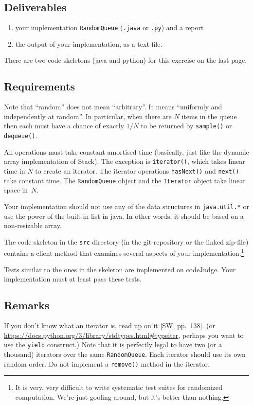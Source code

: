 \documentclass{tufte-handout}
\begin{document}
\subsection{Deliverables}

\begin{enumerate}
\item your implementation {\tt RandomQueue} ({\tt.java} or {\tt.py}) and a report
\item the output of your implementation, as a text file.
\end{enumerate}
There are two code skeletons (java and python) for this exercise on the last page.

\subsection{Requirements}
Note that ``random'' does not mean ``arbitrary''.
It means ``uniformly and independently at random''.
In particular, when there are $N$ items in the queue then each must
have a chance of exactly $1/N$ to be returned by {\tt sample()} or
{\tt dequeue()}.

All operations must take constant amortised time (basically, just like
the dynamic array implementation of Stack).
The exception is {\tt iterator()}, which takes linear time in $N$ to create an iterator.
The iterator operations {\tt hasNext()} and {\tt next()} take constant
time.
The {\tt RandomQueue} object and the {\tt Iterator} object take linear
space in~$N$.

Your implementation should not use any of the data structures in \texttt{java.util.*} or use the power of the built-in list in java. In other words, it should be based on a non-resizable array. 

The code skeleton in the {\tt src} directory (in the git-repository or the linked zip-file) contains a client method
that examines several aspects of your implementation.\footnote{It is very, very difficult to write systematic test suites for
randomized computation. We're just goofing around, but it's better
than nothing.}

Tests similar to the ones in the skeleton are implemented on codeJudge. 
Your implementation must at least pass these tests.

\subsection{Remarks}

If you don't know what an iterator is, read up on it [SW, pp.~138].
(or \url{https://docs.python.org/3/library/stdtypes.html#typeiter}, perhaps you want to use the {\tt yield} construct.)
Note that it is perfectly legal to have two (or a thousand) iterators over the same {\tt RandomQueue}.
Each iterator should use its own random order.
Do not implement a {\tt remove()} method in the iterator.
\end{document}
